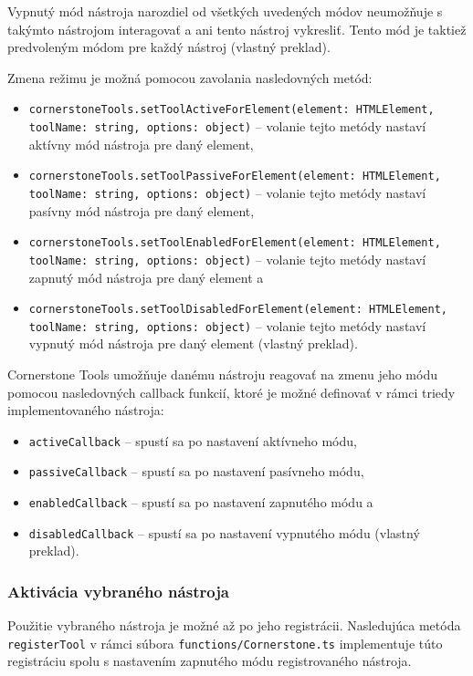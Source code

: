 Vypnutý mód nástroja narozdiel od všetkých uvedených módov neumožňuje s takýmto nástrojom interagovať a ani tento nástroj vykresliť. Tento mód je taktiež predvoleným módom pre každý nástroj \cite{cornerstone_tools_modes} (vlastný preklad).

Zmena režimu je možná pomocou zavolania nasledovných metód:
\begin {itemize}
\item {\texttt{cornerstoneTools.setToolActiveForElement(element: HTMLElement, toolName: string, options: object)} -- volanie tejto metódy nastaví aktívny mód nástroja pre daný element,}
\item {\texttt{cornerstoneTools.setToolPassiveForElement(element: HTMLElement, toolName: string, options: object)} -- volanie tejto metódy nastaví pasívny mód nástroja pre daný element,}
\item {\texttt{cornerstoneTools.setToolEnabledForElement(element: HTMLElement, toolName: string, options: object)} -- volanie tejto metódy nastaví zapnutý mód nástroja pre daný element a}
\item {\texttt{cornerstoneTools.setToolDisabledForElement(element: HTMLElement, toolName: string, options: object)} -- volanie tejto metódy nastaví vypnutý mód nástroja pre daný element  \cite{cornerstone_tools_modes} (vlastný preklad).}
\end {itemize}

Cornerstone Tools umožňuje danému nástroju reagovať na zmenu jeho módu pomocou nasledovných callback funkcií, ktoré je možné definovať v rámci triedy implementovaného nástroja:
\begin {itemize}
\item {\texttt{activeCallback} -- spustí sa po nastavení aktívneho módu,}
\item {\texttt{passiveCallback} -- spustí sa po nastavení pasívneho módu,}
\item {\texttt{enabledCallback} -- spustí sa po nastavení zapnutého módu a}
\item {\texttt{disabledCallback} -- spustí sa po nastavení vypnutého módu  \cite{cornerstone_tools_modes} (vlastný preklad).}
\end {itemize}

\subsubsection {Aktivácia vybraného nástroja}
Použitie vybraného nástroja je možné až po jeho registrácii.
Nasledujúca metóda \texttt{registerTool} v rámci súbora \texttt{functions/Cornerstone.ts} implementuje  túto registráciu spolu s nastavením zapnutého módu registrovaného nástroja.

